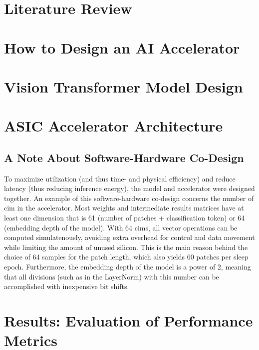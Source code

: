 \documentclass[12pt]{article}
\begin{document}
\newpage
\section{Literature Review}

\label{sec:lit_review}

\newpage
\section{How to Design an AI Accelerator}
\label{sec:methods}


\newpage
\section{Vision Transformer Model Design}
\label{sec:vision_transformer}


\newpage
\section{ASIC Accelerator Architecture}
\label{sec:arch}


\subsection{A Note About Software-Hardware Co-Design}
\label{sec:sw_hw_co-design}
To maximize utilization (and thus time- and physical efficiency) and reduce latency (thus reducing inference energy), the model and accelerator were designed together. An example
of this software-hardware co-design concerns the number of \ac{cim} in the accelerator. Most weights and intermediate results matrices have at least one dimension that is 61 (number
of patches + classification token) or 64 (embedding depth of the model). With 64 \ac{cim}s, all vector operations can be computed simulatenously, avoiding extra overhead for control
and data movement while limiting the amount of unused silicon. This is the main reason behind the choice of 64 samples for the patch length, which also yields 60 patches per sleep
epoch. Furthermore, the embedding depth of the model is a power of 2, meaning that all divisions (such as in the LayerNorm) with this number can be accomplished with inexpensive bit shifts.

\newpage
\section{Results: Evaluation of Performance Metrics}
\label{sec:results}

\end{document}
